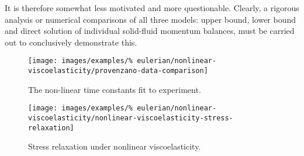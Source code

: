  It is therefore somewhat less motivated and more
questionable. Clearly, a rigorous analysis or numerical comparisons of
all three models: upper bound, lower bound and direct solution of
individual solid-fluid momentum balances, must be carried out to
conclusively demonstrate this.


\begin{figure}[!hptb]
\centering
\texttt{[image: images/examples/\%
eulerian/nonlinear-viscoelasticity/provenzano-data-comparison]}
\caption{The non-linear time constants fit to experiment.} 
\label{provenzano-data-fit}
\end{figure}

\begin{figure}[!hptb]
\centering
\texttt{[image: images/examples/\%
eulerian/nonlinear-viscoelasticity/nonlinear-viscoelasticity-stress-relaxation]}
\caption{Stress relaxation under nonlinear viscoelasticity.}
\label{nonlinear-viscoelasticity-stress-relaxation}
\end{figure}




%

